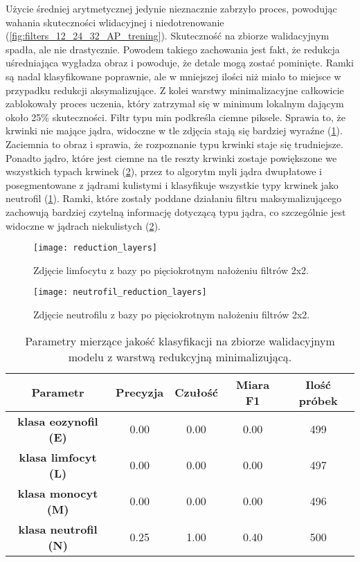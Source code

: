 {\parindent0pt
Użycie średniej arytmetycznej jedynie nieznacznie zabrzyło proces, powodując wahania skuteczności wlidacyjnej i niedotrenowanie (\ref{fig:filters_12_24_32_AP_trening}). Skuteczność na zbiorze walidacyjnym spadła, ale nie drastycznie. Powodem takiego zachowania jest fakt, że redukcja uśredniająca wygładza obraz i powoduje, że detale mogą zostać pominięte. Ramki są nadal klasyfikowane poprawnie, ale w mniejszej ilości niż miało to miejsce w przypadku redukcji aksymalizujące. Z kolei warstwy minimalizacyjne całkowicie zablokowały proces uczenia, który zatrzymał się w minimum lokalnym dającym około 25\% skuteczności. Filtr typu min podkreśla ciemne piksele. Sprawia to, że krwinki nie mające jądra, widoczne w tle zdjęcia stają się bardziej wyraźne (\ref{fig:reduction_layers}). Zaciemnia to obraz i sprawia, że rozpoznanie typu krwinki staje się trudniejsze. Ponadto jądro, które jest ciemne na tle reszty krwinki zostaje powiększone we wszystkich typach krwinek (\ref{fig:neutrofil_reduction_layers}), przez to algorytm myli jądra dwupłatowe i posegmentowane z jądrami kulistymi i klasyfikuje wszystkie typy krwinek jako neutrofil (\ref{tab:min_red_layers_params_val}). Ramki, które zostały poddane działaniu filtru maksymalizującego zachowują bardziej czytelną informację dotyczącą typu jądra, co szczególnie jest widoczne w jądrach niekulistych (\ref{fig:neutrofil_reduction_layers}).

\begin{figure}[h!]
	\centering
	\centering
		\texttt{[image: reduction\_layers]}	
	\caption{Zdjęcie limfocytu z bazy po pięciokrotnym nałożeniu filtrów 2x2.}	\label{fig:reduction_layers}
\end{figure}

\begin{figure}[h!]
	\centering
	\centering
		\texttt{[image: neutrofil\_reduction\_layers]}	
	\caption{Zdjęcie neutrofilu z bazy po pięciokrotnym nałożeniu filtrów 2x2.}\label{fig:neutrofil_reduction_layers}
\end{figure}

\begin{table}[h!]
\centering
\caption[Short Heading]{Parametry mierzące jakość klasyfikacji na zbiorze walidacyjnym modelu z warstwą redukcyjną minimalizującą.}
\label{tab:min_red_layers_params_val}
\begin{tabular}{|c|c|c|c|c|}
\hline
\textbf{Parametr}                               & \textbf{Precyzja} & \textbf{Czułość} & \textbf{Miara F1} & \textbf{Ilość próbek} \\ \hline
\textbf{klasa eozynofil (E)} & 0.00   & 0.00   & 0.00 & 499  \\ \hline
\textbf{klasa limfocyt (L)}& 0.00   & 0.00   & 0.00 & 497  \\ \hline
\textbf{klasa monocyt (M)} & 0.00   & 0.00   & 0.00 & 496  \\ \hline
\textbf{klasa neutrofil (N)} & 0.25   & 1.00    & 0.40  & 500  \\ \hline
\end{tabular}
\end{table}
}

